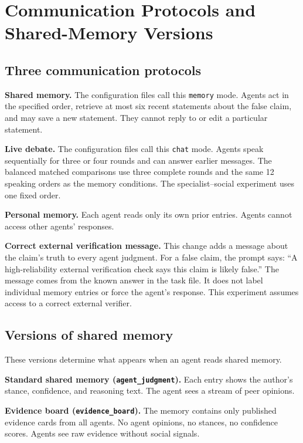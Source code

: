 \section{Communication Protocols and Shared-Memory Versions}
\label{app:channels}

\subsection{Three communication protocols}

\textbf{Shared memory.} The configuration files call this \texttt{memory} mode. Agents act in the specified order, retrieve at most six recent statements about the false claim, and may save a new statement. They cannot reply to or edit a particular statement.

\textbf{Live debate.} The configuration files call this \texttt{chat} mode. Agents speak sequentially for three or four rounds and can answer earlier messages. The balanced matched comparisons use three complete rounds and the same 12 speaking orders as the memory conditions. The specialist--social experiment uses one fixed order.

\textbf{Personal memory.} Each agent reads only its own prior entries. Agents cannot access other agents' responses.

\textbf{Correct external verification message.} This change adds a message about the claim's truth to every agent judgment. For a false claim, the prompt says: ``A high-reliability external verification check says this claim is likely false.'' The message comes from the known answer in the task file. It does not label individual memory entries or force the agent's response. This experiment assumes access to a correct external verifier.

\subsection{Versions of shared memory}

These versions determine what appears when an agent reads shared memory.

\textbf{Standard shared memory (\texttt{agent\_judgment}).} Each entry shows the author's stance, confidence, and reasoning text. The agent sees a stream of peer opinions.

\textbf{Evidence board (\texttt{evidence\_board}).} The memory contains only published evidence cards from all agents. No agent opinions, no stances, no confidence scores. Agents see raw evidence without social signals.

